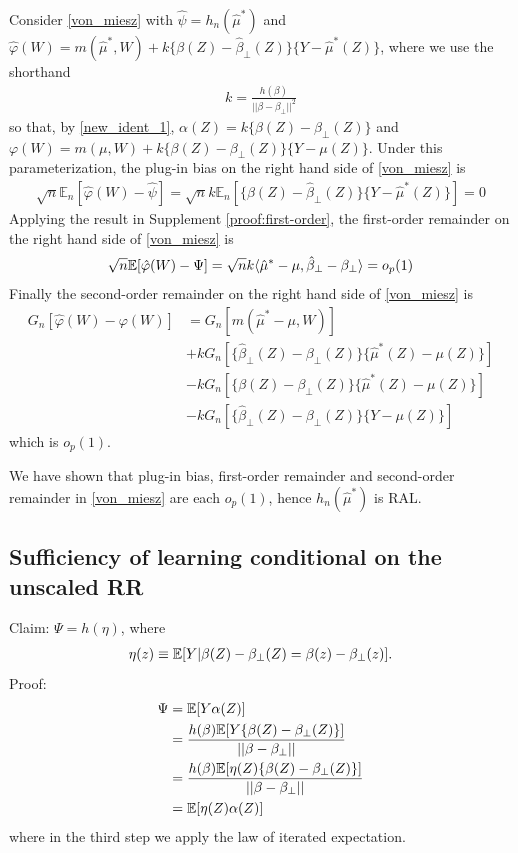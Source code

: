 Consider \eqref{von_miesz} with $\hat{\psi} = h_n(\hat{\mu}^*)$ and $\hat{\varphi}(W) = m(\hat{\mu}^*, W) + k\{\beta(Z) - \hat{\beta}_\perp(Z)\}\{Y - \hat{\mu}^*(Z)\}$, where we use the shorthand
\begin{align*}
    k = \frac{h(\beta)}{||\beta - \beta_\perp||^2}
\end{align*}
so that, by \eqref{new_ident_1}, $\alpha(Z) = k\{\beta(Z) - \beta_\perp(Z)\}$ and $\varphi(W) = m(\mu, W) + k\{\beta(Z) - \beta_\perp(Z)\}\{Y - \mu(Z)\}$.
Under this parameterization, the plug-in bias on the right hand side of \eqref{von_miesz} is
\begin{align*}
    \sqrt{n} \mathbb{E}_n[\hat{\varphi}(W) - \hat{\psi}]= \sqrt{n} k \mathbb{E}_n[\{\beta(Z) - \hat{\beta}_\perp(Z)\}\{Y - \hat{\mu}^*(Z)\}] = 0
\end{align*}
Applying the result in Supplement \ref{proof:first-order}, the first-order remainder on the right hand side of \eqref{von_miesz} is
\begin{align*}
    \sqrt{n}\mathbb{E}[\hat{\varphi}(W) - \Psi] = \sqrt{n} k \langle \hat{\mu}^* - \mu, \hat{\beta}_\perp - \beta_\perp \rangle = o_p(1)
\end{align*}
Finally the second-order remainder on the right hand side of \eqref{von_miesz} is
\begin{align*}
    G_n \left[\hat{\varphi}(W) - \varphi(W)\right] &= G_n[m(\hat{\mu}^* - \mu, W)] \\
    &+ k G_n\left[\{\hat{\beta}_\perp(Z) - \beta_\perp(Z)\}\{\hat{\mu}^*(Z) - \mu(Z)\}\right] \\
    &- k G_n\left[\{\beta(Z) - \beta_\perp(Z)\}\{\hat{\mu}^*(Z) - \mu(Z)\}\right] \\
    &-k G_n\left[\{\hat{\beta}_\perp(Z) - \beta_\perp(Z)\}\{Y - \mu(Z)\}\right] 
\end{align*}
which is $o_p(1)$.

We have shown that plug-in bias, first-order remainder and second-order remainder in \eqref{von_miesz} are each $o_p(1)$, hence $h_n(\hat{\mu}^*)$ is RAL.

\subsection{Sufficiency of learning conditional on the unscaled RR}
\label{proof_of_suff}
Claim: $\Psi = h(\eta)$, where
\begin{align*}
    \eta(z) \equiv \mathbb{E}[Y|\beta(Z) - \beta_\perp(Z) = \beta(z) - \beta_\perp(z)].
\end{align*}
Proof:
\begin{align*}
    \Psi &= \mathbb{E}[Y \alpha(Z)] \\
    &= \frac{h(\beta) \mathbb{E}[Y \{\beta(Z) - \beta_\perp(Z)\}]}{||\beta - \beta_\perp||} \\
    &= \frac{h(\beta) \mathbb{E}[\eta(Z) \{\beta(Z) - \beta_\perp(Z)\}]}{||\beta - \beta_\perp||} \\
    &= \mathbb{E}[\eta(Z) \alpha(Z)]
\end{align*}
where in the third step we apply the law of iterated expectation.


